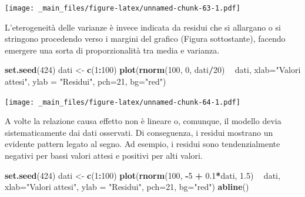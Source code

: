\documentclass[a4paper,12pt,oneside]{book}
\newenvironment{Shaded}{\begin{snugshade}}{\end{snugshade}}
\newcommand{\KeywordTok}[1]{\textcolor[rgb]{0.13,0.29,0.53}{\textbf{#1}}}
\newcommand{\DataTypeTok}[1]{\textcolor[rgb]{0.13,0.29,0.53}{#1}}
\newcommand{\DecValTok}[1]{\textcolor[rgb]{0.00,0.00,0.81}{#1}}
\newcommand{\FloatTok}[1]{\textcolor[rgb]{0.00,0.00,0.81}{#1}}
\newcommand{\StringTok}[1]{\textcolor[rgb]{0.31,0.60,0.02}{#1}}
\newcommand{\OperatorTok}[1]{\textcolor[rgb]{0.81,0.36,0.00}{\textbf{#1}}}
\newcommand{\NormalTok}[1]{#1}
\theoremstyle{definition}
\theoremstyle{definition}
\theoremstyle{definition}
\theoremstyle{remark}
\begin{document}
\texttt{[image: \_main\_files/figure-latex/unnamed-chunk-63-1.pdf]}

L'eterogeneità delle varianze è invece indicata da residui che si
allargano o si stringono procedendo verso i margini del grafico (Figura
sottostante), facendo emergere una sorta di proporzionalità tra media e
varianza.

\begin{Shaded}
\begin{Highlighting}[]
\KeywordTok{set.seed}\NormalTok{(}\DecValTok{424}\NormalTok{)}
\NormalTok{dati <-}\StringTok{ }\KeywordTok{c}\NormalTok{(}\DecValTok{1}\OperatorTok{:}\DecValTok{100}\NormalTok{)}
\KeywordTok{plot}\NormalTok{(}\KeywordTok{rnorm}\NormalTok{(}\DecValTok{100}\NormalTok{, }\DecValTok{0}\NormalTok{, dati}\OperatorTok{/}\DecValTok{20}\NormalTok{) }\OperatorTok{~}\StringTok{ }\NormalTok{dati, }\DataTypeTok{xlab=}\StringTok{"Valori attesi"}\NormalTok{, }
     \DataTypeTok{ylab =} \StringTok{"Residui"}\NormalTok{, }\DataTypeTok{pch=}\DecValTok{21}\NormalTok{, }\DataTypeTok{bg=}\StringTok{"red"}\NormalTok{)}
\end{Highlighting}
\end{Shaded}

\texttt{[image: \_main\_files/figure-latex/unnamed-chunk-64-1.pdf]}

A volte la relazione causa effetto non è lineare o, comunque, il modello
devia sistematicamente dai dati osservati. Di conseguenza, i residui
mostrano un evidente pattern legato al segno. Ad esempio, i residui sono
tendenzialmente negativi per bassi valori attesi e positivi per alti
valori.

\begin{Shaded}
\begin{Highlighting}[]
\KeywordTok{set.seed}\NormalTok{(}\DecValTok{424}\NormalTok{)}
\NormalTok{dati <-}\StringTok{ }\KeywordTok{c}\NormalTok{(}\DecValTok{1}\OperatorTok{:}\DecValTok{100}\NormalTok{)}
\KeywordTok{plot}\NormalTok{(}\KeywordTok{rnorm}\NormalTok{(}\DecValTok{100}\NormalTok{, }\OperatorTok{-}\DecValTok{5} \OperatorTok{+}\StringTok{ }\FloatTok{0.1}\OperatorTok{*}\NormalTok{dati, }\FloatTok{1.5}\NormalTok{) }\OperatorTok{~}\StringTok{ }\NormalTok{dati, }\DataTypeTok{xlab=}\StringTok{"Valori attesi"}\NormalTok{, }\DataTypeTok{ylab =} \StringTok{"Residui"}\NormalTok{, }\DataTypeTok{pch=}\DecValTok{21}\NormalTok{, }\DataTypeTok{bg=}\StringTok{"red"}\NormalTok{)}
\KeywordTok{abline}\NormalTok{()}
\end{Highlighting}
\end{Shaded}
\end{document}
